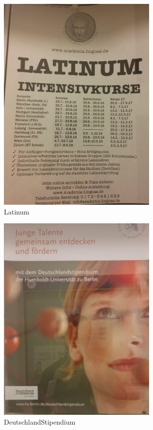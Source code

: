 \documentclass[]{scrartcl}
\begin{document}
\begin{figure}[h]
	\centering
	\includegraphics[width=0.7\textwidth]{images/studienorga/latin.jpg}
	\caption{Latinum}
	\label{fig:sts}
\end{figure}


\begin{figure}[h]
	\centering
	\includegraphics[width=0.7\textwidth]{images/studienorga/stip.jpg}
	\caption{DeutschlandStipendium}
	\label{fig:strss}
\end{figure}
\end{document}
